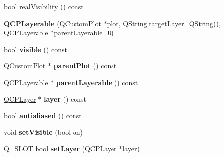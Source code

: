 \begin{DoxyCompactItemize}
\item 
bool \hyperlink{class_q_c_p_layerable_ab054e88f15d485defcb95e7376f119e7}{real\+Visibility} () const
\item 
\mbox{\label{class_q_c_p_layerable_a74c0fa237f29bf0e49565013fc5d1ec0}} 
{\bfseries Q\+C\+P\+Layerable} (\hyperlink{class_q_custom_plot}{Q\+Custom\+Plot} $\ast$plot, Q\+String target\+Layer=Q\+String(), \hyperlink{class_q_c_p_layerable}{Q\+C\+P\+Layerable} $\ast$\hyperlink{class_q_c_p_layerable_aa78b7e644d2c519e1a9a6f2ac5fcd858}{parent\+Layerable}=0)
\item 
\mbox{\label{class_q_c_p_layerable_af0297b944b6192b6d67d00bff41b6b70}} 
bool {\bfseries visible} () const
\item 
\mbox{\label{class_q_c_p_layerable_a473edb813a4c1929d6b6a8fe3ff3faf7}} 
\hyperlink{class_q_custom_plot}{Q\+Custom\+Plot} $\ast$ {\bfseries parent\+Plot} () const
\item 
\mbox{\label{class_q_c_p_layerable_abc03f9a72856e3fb2fcd7bcf86312dad}} 
\hyperlink{class_q_c_p_layerable}{Q\+C\+P\+Layerable} $\ast$ {\bfseries parent\+Layerable} () const
\item 
\mbox{\label{class_q_c_p_layerable_a5ff4862e8c784c9f5986dbc1533ba2a4}} 
\hyperlink{class_q_c_p_layer}{Q\+C\+P\+Layer} $\ast$ {\bfseries layer} () const
\item 
\mbox{\label{class_q_c_p_layerable_a71cbd212fde2703cee076e204a475709}} 
bool {\bfseries antialiased} () const
\item 
\mbox{\label{class_q_c_p_layerable_a3bed99ddc396b48ce3ebfdc0418744f8}} 
void {\bfseries set\+Visible} (bool on)
\item 
\mbox{\label{class_q_c_p_layerable_aea8c061ee8a1aa7ea88ee9ca9cbaa773}} 
Q\+\_\+\+S\+L\+OT bool {\bfseries set\+Layer} (\hyperlink{class_q_c_p_layer}{Q\+C\+P\+Layer} $\ast$layer)
\item 
\mbox{\label{class_q_c_p_layerable_ab25a0e7b897993b44447caee0f142083}} 

\end{DoxyCompactItemize}
